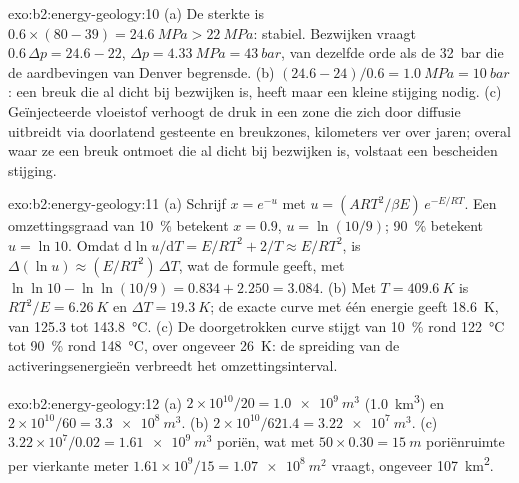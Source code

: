 \begin{solution}{exo:b2:energy-geology:10}
(a) De sterkte is $0.6 \times (80 - 39) = \qty{24.6}{MPa} > \qty{22}{MPa}$: stabiel. Bezwijken vraagt
$0.6\,\Delta p = 24.6 - 22$, $\Delta p = \qty{4.33}{MPa} = \qty{43}{bar}$, van dezelfde orde als de
\qty{32}{bar} die de aardbevingen van Denver begrensde. (b) $(24.6 - 24)/0.6 = \qty{1.0}{MPa} =
\qty{10}{bar}$: een breuk die al dicht bij bezwijken is, heeft maar een kleine stijging nodig. (c) Geïnjecteerde vloeistof verhoogt
de druk in een zone die zich door diffusie uitbreidt via doorlatend gesteente en breukzones, kilometers
ver over jaren; overal waar ze een breuk ontmoet die al dicht bij bezwijken is, volstaat een bescheiden stijging.
\end{solution}

\begin{solution}{exo:b2:energy-geology:11}
(a) Schrijf $x = e^{-u}$ met $u = (ART^2/\beta E)\,e^{-E/RT}$. Een omzettingsgraad van
\qty{10}{\percent} betekent $x = 0.9$, $u = \ln(10/9)$; \qty{90}{\percent} betekent $u = \ln 10$. Omdat
$\mathrm{d}\ln u/\mathrm{d}T = E/RT^2 + 2/T \approx E/RT^2$, is $\Delta(\ln u) \approx (E/RT^2)\,\Delta T$,
wat de formule geeft, met $\ln\ln 10 - \ln\ln(10/9) = 0.834 + 2.250 = 3.084$. (b) Met $T =
\qty{409.6}{K}$ is $RT^2/E = \qty{6.26}{K}$ en $\Delta T = \qty{19.3}{K}$; de exacte curve met één energie
geeft \qty{18.6}{K}, van 125.3 tot \qty{143.8}{\celsius}. (c) De doorgetrokken curve stijgt van
\qty{10}{\percent} rond \qty{122}{\celsius} tot \qty{90}{\percent} rond \qty{148}{\celsius}, over ongeveer
\qty{26}{K}: de spreiding van de activeringsenergieën verbreedt het omzettingsinterval.
\end{solution}

\begin{solution}{exo:b2:energy-geology:12}
(a) $2 \times 10^{10}/20 = \qty{1.0e9}{m^3}$ (\qty{1.0}{km^3}) en $2 \times 10^{10}/60 =
\qty{3.3e8}{m^3}$. (b) $2 \times 10^{10}/621.4 = \qty{3.22e7}{m^3}$. (c) $3.22 \times 10^7/0.02 =
\qty{1.61e9}{m^3}$ poriën, wat met $50 \times 0.30 = \qty{15}{m}$ poriënruimte per vierkante
meter $1.61 \times 10^9/15 = \qty{1.07e8}{m^2}$ vraagt, ongeveer \qty{107}{km^2}.
\end{solution}

